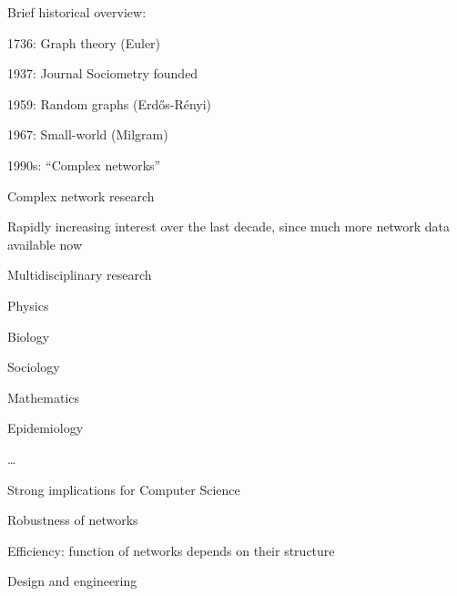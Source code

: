 \begin{frame}{Brief historical overview:}
	
\BIL
\item 1736:		 	Graph theory (Euler)
\item 1937:			Journal Sociometry founded
\item 1959:			Random graphs (Erdős-Rényi)
\item 1967:			Small-world (Milgram)
\item 1990s:		“Complex networks” 	 
\EIL

\end{frame}


\begin{frame}{Complex network research}

\BIL
\item Rapidly increasing interest over the last decade, since much more network data available now
\item Multidisciplinary research 
  \BI
  \item Physics
  \item Biology
  \item Sociology
  \item Mathematics
  \item Epidemiology
  \item \ldots
  \EI
\item Strong implications for Computer Science
\BI
\item Robustness of networks
\item Efficiency: function of networks depends on their structure
\item Design and engineering
\EI
\EIL
\end{frame}

